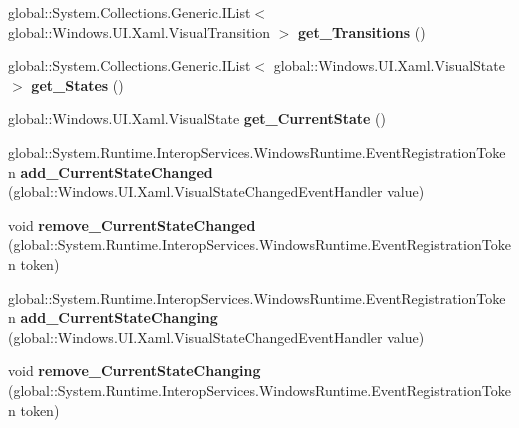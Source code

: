 \begin{DoxyCompactItemize}
global\+::\+System.\+Collections.\+Generic.\+I\+List$<$ global\+::\+Windows.\+U\+I.\+Xaml.\+Visual\+Transition $>$ {\bfseries get\+\_\+\+Transitions} ()
\item 
\mbox{\label{class_windows_1_1_u_i_1_1_xaml_1_1_visual_state_group_a5f5c4abd2e95e2f7522780c26a7db8fd}} 
global\+::\+System.\+Collections.\+Generic.\+I\+List$<$ global\+::\+Windows.\+U\+I.\+Xaml.\+Visual\+State $>$ {\bfseries get\+\_\+\+States} ()
\item 
\mbox{\label{class_windows_1_1_u_i_1_1_xaml_1_1_visual_state_group_a74be4bea547bdf72e792a3c489cb7878}} 
global\+::\+Windows.\+U\+I.\+Xaml.\+Visual\+State {\bfseries get\+\_\+\+Current\+State} ()
\item 
\mbox{\label{class_windows_1_1_u_i_1_1_xaml_1_1_visual_state_group_ab8a602f85c6928ad4dbda31b0fc3d4fc}} 
global\+::\+System.\+Runtime.\+Interop\+Services.\+Windows\+Runtime.\+Event\+Registration\+Token {\bfseries add\+\_\+\+Current\+State\+Changed} (global\+::\+Windows.\+U\+I.\+Xaml.\+Visual\+State\+Changed\+Event\+Handler value)
\item 
\mbox{\label{class_windows_1_1_u_i_1_1_xaml_1_1_visual_state_group_a51b022e4c0673d691c79a0f52b0ca0af}} 
void {\bfseries remove\+\_\+\+Current\+State\+Changed} (global\+::\+System.\+Runtime.\+Interop\+Services.\+Windows\+Runtime.\+Event\+Registration\+Token token)
\item 
\mbox{\label{class_windows_1_1_u_i_1_1_xaml_1_1_visual_state_group_a5fad6e8105f727dac7ab1a1b62568c0a}} 
global\+::\+System.\+Runtime.\+Interop\+Services.\+Windows\+Runtime.\+Event\+Registration\+Token {\bfseries add\+\_\+\+Current\+State\+Changing} (global\+::\+Windows.\+U\+I.\+Xaml.\+Visual\+State\+Changed\+Event\+Handler value)
\item 
\mbox{\label{class_windows_1_1_u_i_1_1_xaml_1_1_visual_state_group_aa287d3d7b305f3adad8090ce145b7729}} 
void {\bfseries remove\+\_\+\+Current\+State\+Changing} (global\+::\+System.\+Runtime.\+Interop\+Services.\+Windows\+Runtime.\+Event\+Registration\+Token token)

\end{DoxyCompactItemize}
